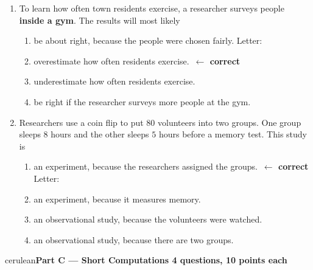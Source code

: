 \documentclass[10pt]{article}
\makeatletter
\newcommand{\parthead}[1]{%
  \vspace{6pt}\noindent
  {\tcbset{after={\par\nopagebreak}}%
   \begin{headlinebox}{cerulean}{\color{white}\bfseries #1}\end{headlinebox}}%
  \nopagebreak\vspace{4pt}}
\newcommand{\correct}{\ifsaar@workvisible\ \textcolor{keyred}{\textbf{$\leftarrow$ correct}}\fi}
\makeatother
\begin{document}
\begin{enumerate}[leftmargin=2.2em, itemsep=5pt, topsep=2pt, start=11]
\boxguard[7]
\item To learn how often town residents exercise, a researcher surveys people
\textbf{inside a gym}. The results will most likely
\begin{enumerate}[label=(\Alph*), leftmargin=1.8em, itemsep=1pt, topsep=1pt]
  \item be about right, because the people were chosen fairly.
\hfill Letter:~\gradedblank[id=q14, type=choice, points=4, answer={B}]{0.45in}{10pt}  \item overestimate how often residents exercise.\correct
  \item underestimate how often residents exercise.
  \item be right if the researcher surveys more people at the gym.
\end{enumerate}

\boxguard[7]
\item Researchers use a coin flip to put $80$ volunteers into two groups. One group
sleeps $8$ hours and the other sleeps $5$ hours before a memory test. This study is
\begin{enumerate}[label=(\Alph*), leftmargin=1.8em, itemsep=1pt, topsep=1pt]
  \item an experiment, because the researchers assigned the groups.\correct
\hfill Letter:~\gradedblank[id=q15, type=choice, points=4, answer={A}]{0.45in}{10pt}  \item an experiment, because it measures memory.
  \item an observational study, because the volunteers were watched.
  \item an observational study, because there are two groups.
\end{enumerate}

\end{enumerate}
\normalsize

\boxguard[12]
\parthead{Part C --- Short Computations \hfill 4 questions, 10 points each}
\end{document}
